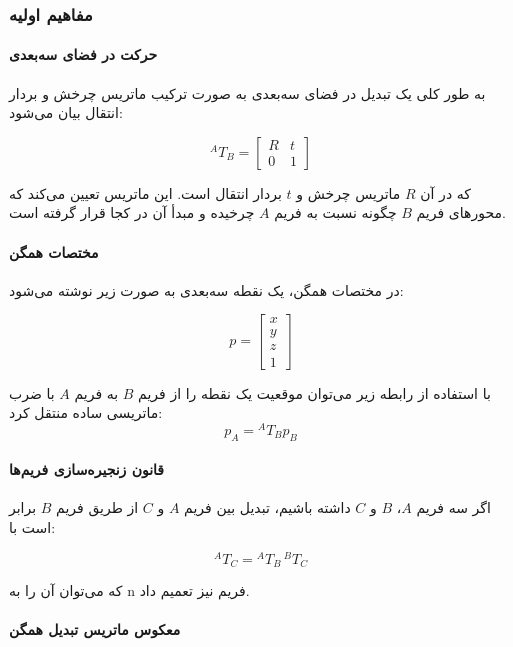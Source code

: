 \documentclass{article}
\begin{document}
\subsubsection{مفاهیم اولیه}
\paragraph{حرکت در فضای سه‌بعدی}

به طور کلی یک تبدیل در فضای سه‌بعدی به صورت ترکیب ماتریس چرخش و بردار انتقال بیان می‌شود:

\[
{}^{A}T_{B} =
\begin{bmatrix}
	R & t \\
	0 & 1
\end{bmatrix}
\]

که در آن \(R\) ماتریس چرخش و \(t\) بردار انتقال است. این ماتریس تعیین می‌کند که محورهای فریم \(B\) چگونه نسبت به فریم \(A\) چرخیده و مبدأ آن در کجا قرار گرفته است.

\paragraph{مختصات همگن}

در مختصات همگن، یک نقطه سه‌بعدی به صورت زیر نوشته می‌شود:

\[
p =
\begin{bmatrix}
	x\\y\\z\\1
\end{bmatrix}
\]

با استفاده از رابطه زیر می‌توان موقعیت یک نقطه را از فریم \(B\) به فریم \(A\) با ضرب ماتریسی ساده منتقل کرد:
\[
p_A = {}^{A}T_{B} p_B
\]



\paragraph{قانون زنجیره‌سازی فریم‌ها}

اگر سه فریم \(A\)، \(B\) و \(C\) داشته باشیم، تبدیل بین فریم \(A\) و \(C\) از طریق فریم \(B\) برابر است با:

\[
{}^{A}T_C = {}^{A}T_B \, {}^{B}T_C
\]

که می‌توان آن را به n فریم نیز تعمیم داد.

\paragraph{معکوس ماتریس تبدیل همگن}
\end{document}
